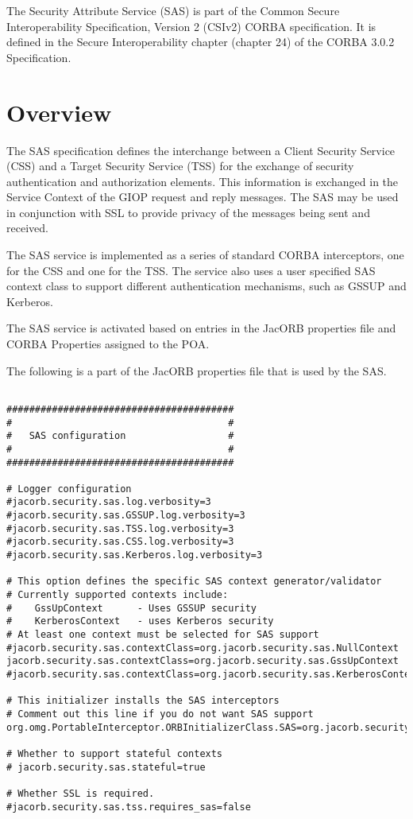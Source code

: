 
The Security Attribute Service (SAS) is part of the Common Secure
Interoperability Specification, Version 2 (CSIv2) CORBA specification.
It is defined in the Secure Interoperability chapter (chapter 24) of the
CORBA 3.0.2 Specification.

\section{Overview}

The SAS specification defines the interchange between a Client Security
Service (CSS) and a Target Security Service (TSS)
for the exchange of security authentication and authorization
elements. This information is exchanged in the Service Context of the GIOP
request and reply messages. The SAS may be used in conjunction with SSL to
provide privacy of the messages being sent and received.

The SAS service is implemented as a series of standard CORBA interceptors,
one for the CSS and one for the TSS. The service also uses a user specified
SAS context class to support different authentication mechanisms, such as
GSSUP and Kerberos.

The SAS service is activated based on entries in the JacORB properties file
and CORBA Properties assigned to the POA.

The following is a part of the JacORB properties file that is used by
the SAS.

\begin{scriptsize}
\begin{verbatim}

########################################
#                                      #
#   SAS configuration                  #
#                                      #
########################################

# Logger configuration
#jacorb.security.sas.log.verbosity=3
#jacorb.security.sas.GSSUP.log.verbosity=3
#jacorb.security.sas.TSS.log.verbosity=3
#jacorb.security.sas.CSS.log.verbosity=3
#jacorb.security.sas.Kerberos.log.verbosity=3

# This option defines the specific SAS context generator/validator
# Currently supported contexts include:
#    GssUpContext      - Uses GSSUP security
#    KerberosContext   - uses Kerberos security
# At least one context must be selected for SAS support
#jacorb.security.sas.contextClass=org.jacorb.security.sas.NullContext
jacorb.security.sas.contextClass=org.jacorb.security.sas.GssUpContext
#jacorb.security.sas.contextClass=org.jacorb.security.sas.KerberosContext

# This initializer installs the SAS interceptors
# Comment out this line if you do not want SAS support
org.omg.PortableInterceptor.ORBInitializerClass.SAS=org.jacorb.security.sas.SASInitializer

# Whether to support stateful contexts
# jacorb.security.sas.stateful=true

# Whether SSL is required.
#jacorb.security.sas.tss.requires_sas=false
\end{verbatim}
\end{scriptsize}


